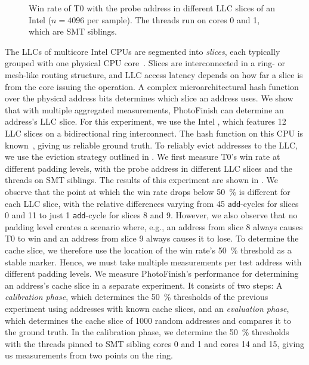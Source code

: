 \documentclass[letterpaper,twocolumn,10pt]{article} %
\newcommand{\AttackName}{PhotoFinish\xspace}
\newcommand{\tprobe}{{\fontfamily{cmtt}\selectfont T0}\xspace}
\begin{document}
\begin{figure}[t]
  
  \caption{Win rate of \tprobe with the probe address in different LLC slices of an Intel \labfourtytwoCPU ($n = 4096$ per sample). The threads run on cores 0 and 1, which are SMT siblings.}
  \label{fig:llc-slices}
\end{figure}
The LLCs of multicore Intel CPUs are segmented into \textit{slices}, each typically grouped with one physical CPU core~\cite{Irazoqui2015slice,Gerlach2024Hash,Rainer2025slice,Morgan2025slice}.
Slices are interconnected in a ring- or mesh-like routing structure, and LLC access latency depends on how far a slice is from the core issuing the operation.
A complex microarchitectural hash function over the physical address bits determines which slice an address uses.
We show that with multiple aggregated measurements, \AttackName can determine an address's LLC slice.
For this experiment, we use the Intel \labfourtytwoCPU, which features \num{12} LLC slices on a bidirectional ring interconnect.
The hash function on this CPU is known~\cite{Rainer2025slice}, giving us reliable ground truth.
To reliably evict addresses to the LLC, we use the eviction strategy outlined in .
We first measure \tprobe's win rate at different padding levels, with the probe address in different LLC slices and the threads on SMT siblings.
The results of this experiment are shown in .
We observe that the point at which the win rate drops below \SI{50}{\percent} is different for each LLC slice, with the relative differences varying from \num{45} \texttt{add}-cycles for slices \num{0} and \num{11}  to just \num{1} \texttt{add}-cycle for slices \num{8} and \num{9}.
However, we also observe that no padding level creates a scenario where, e.g., an address from slice \num{8} always causes \tprobe to win and an address from slice \num{9} always causes it to lose.
To determine the cache slice, we therefore use the location of the win rate's \SI{50}{\percent} threshold as a stable marker.
Hence, we must take multiple measurements per test address with different padding levels.
We measure \AttackName's performance for determining an address's cache slice in a separate experiment.
It consists of two steps: A \emph{calibration phase}, which determines the \SI{50}{\percent} thresholds of the previous experiment using addresses with known cache slices, and an \emph{evaluation phase}, which determines the cache slice of \num{1000} random addresses and compares it to the ground truth.
In the calibration phase, we determine the \SI{50}{\percent} thresholds with the threads pinned to SMT sibling cores \num{0} and \num{1} and cores \num{14} and \num{15}, giving us measurements from two points on the ring.
\end{document}
